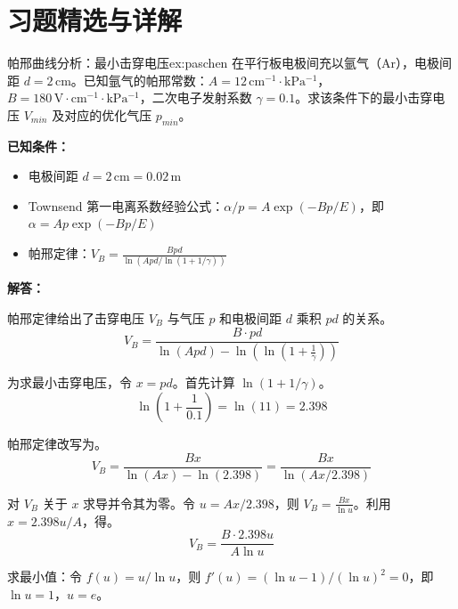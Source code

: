 

\section{习题精选与详解}

\begin{example}{帕邢曲线分析：最小击穿电压}{ex:paschen}
在平行板电极间充以氩气（Ar），电极间距 $d=2\,\mathrm{cm}$。已知氩气的帕邢常数：$A=12\,\mathrm{cm^{-1}\cdot kPa^{-1}}$，$B=180\,\mathrm{V\cdot cm^{-1}\cdot kPa^{-1}}$，二次电子发射系数 $\gamma=0.1$。求该条件下的最小击穿电压 $V_{min}$ 及对应的优化气压 $p_{min}$。
\end{example}

\textbf{已知条件：}
\begin{itemize}
    \item 电极间距 $d = 2\,\mathrm{cm} = 0.02\,\mathrm{m}$
    \item Townsend 第一电离系数经验公式：$\alpha/p = A\exp(-Bp/E)$，即 $\alpha = A p \exp(-Bp/E)$
    \item 帕邢定律：$V_B = \frac{B p d}{\ln(A p d / \ln(1+1/\gamma))}$
\end{itemize}

\textbf{解答：}

帕邢定律给出了击穿电压 $V_B$ 与气压 $p$ 和电极间距 $d$ 乘积 $pd$ 的关系。
\begin{equation}
    V_B = \frac{B \cdot p d}{\ln(A p d) - \ln\left(\ln\left(1+\frac{1}{\gamma}\right)\right)}
\label{eq:ch11-paschen-law}
\end{equation}

为求最小击穿电压，令 $x = pd$。首先计算 $\ln(1+1/\gamma)$。
\[
    \ln\left(1+\frac{1}{0.1}\right) = \ln(11) = 2.398
\]

帕邢定律改写为。
\[
    V_B = \frac{B x}{\ln(A x) - \ln(2.398)} = \frac{B x}{\ln(A x / 2.398)}
\]

对 $V_B$ 关于 $x$ 求导并令其为零。令 $u = A x / 2.398$，则 $V_B = \frac{B x}{\ln u}$。利用 $x = 2.398 u / A$，得。
\[
    V_B = \frac{B \cdot 2.398 u}{A \ln u}
\]

求最小值：令 $f(u) = u / \ln u$，则 $f'(u) = (\ln u - 1) / (\ln u)^2 = 0$，即 $\ln u = 1$，$u = e$。

